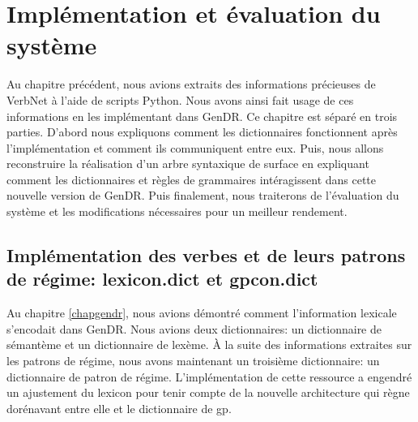 \chapter{Implémentation et évaluation du système}\label{eval}

Au chapitre précédent, nous avions extraits des informations précieuses de VerbNet à l'aide de scripts Python. Nous avons ainsi fait usage de ces informations en les implémentant dans GenDR. Ce chapitre est séparé en trois parties. D'abord nous expliquons comment les dictionnaires fonctionnent après l'implémentation et comment ils communiquent entre eux. Puis, nous allons reconstruire la réalisation d'un arbre syntaxique de surface en expliquant comment les dictionnaires et règles de grammaires intéragissent dans cette nouvelle version de GenDR. Puis finalement, nous traiterons de l'évaluation du système et les modifications nécessaires pour un meilleur rendement.

\section{Implémentation des verbes et de leurs patrons de régime: lexicon.dict et gpcon.dict}

Au chapitre \ref{chapgendr}, nous avions démontré comment l'information lexicale s'encodait dans GenDR. Nous avions deux dictionnaires: un dictionnaire de sémantème et un dictionnaire de lexème. À la suite des informations extraites sur les patrons de régime, nous avons maintenant un troisième dictionnaire: un dictionnaire de patron de régime. L'implémentation de cette ressource a engendré un ajustement du lexicon pour tenir compte de la nouvelle architecture qui règne dorénavant entre elle et le dictionnaire de gp.

